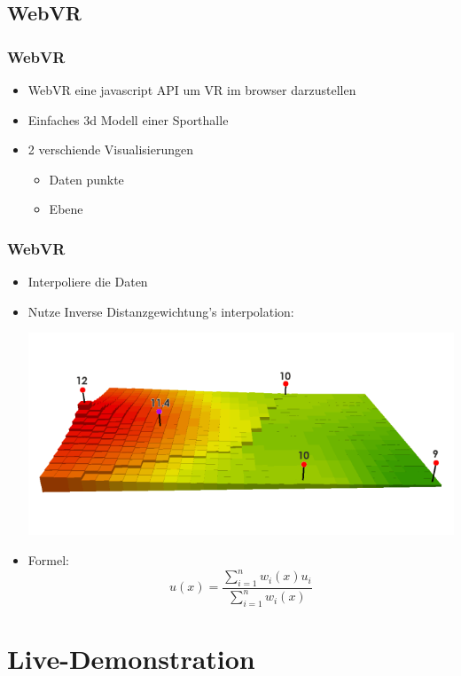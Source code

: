 \documentclass{beamer}
\begin{document}
\subsection{WebVR}

\begin{frame}
\frametitle{WebVR}
\begin{itemize}
  \item WebVR eine javascript API um VR im browser darzustellen \pause
  \item Einfaches 3d Modell einer Sporthalle \pause
  \item 2 verschiende Visualisierungen
  \begin{itemize}
    \item Daten punkte
    \item Ebene
  \end{itemize}
\end{itemize}
\end{frame}

\begin{frame}
\frametitle{WebVR}
\begin{itemize}
  \item Interpoliere die Daten \pause
  \item Nutze Inverse Distanzgewichtung's interpolation:
  \begin{center}
  \includegraphics[scale=0.3]{IDW.png}
  \end{center}
  \pause
  \item Formel:
  $$
  u(x) = \frac{\sum_{i=1}^n w_i(x)u_i}{\sum_{i=1}^n w_i(x)}
  $$
\end{itemize}
\end{frame}


\section{Live-Demonstration}
\end{document}
